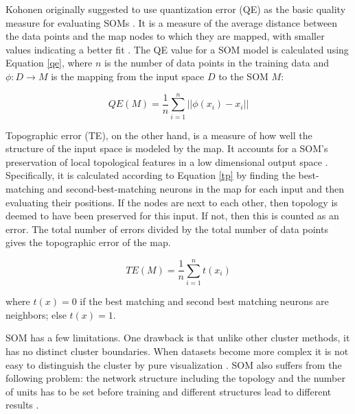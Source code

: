 Kohonen originally suggested to use quantization error (QE) as the basic quality measure for evaluating SOMs \cite{Kohonen2001}. It is a measure of the average distance between the data points and the map nodes to which they are mapped, with smaller values indicating a better fit \cite{SOM2017}. The QE value for a SOM model is calculated using Equation \ref{qe}, where $n$ is the number of data points in the training data and $\phi : D \rightarrow M$ is the mapping from the input
space $D$ to the SOM $M$:

\begin{equation}\label{qe}
QE(M) = \frac{1}{n} \sum_{i=1}^{n} || \phi (x_i) - x_i||
\end{equation}

Topographic error (TE), on the other hand, is a measure of how well the structure of the input space is modeled by the map. It accounts for a SOM's preservation of local topological features in a low dimensional output space \cite{SOM2017}. Specifically, it is calculated according to Equation \ref{tp} by finding the best-matching and second-best-matching neurons in the map for each input and then evaluating their positions. If the nodes are next to each other, then topology is deemed to have been preserved for this input. If not, then this is counted as an error. The total number of errors divided by the total number of data points gives the topographic error of the map.  

\begin{equation}\label{tp}
TE(M) = \frac{1}{n} \sum_{i=1}^{n} t(x_i)
\end{equation}

where $t(x) = 0$ if the best matching and second best matching neurons are neighbors; else $t(x) = 1$.



SOM has a few limitations. One drawback is that unlike other cluster methods, it has no distinct cluster boundaries. When datasets become more complex it is not easy to distinguish the cluster by pure visualization \cite{SOM2016casestudy}. SOM also suffers from the following problem: the network structure including the topology and the number of units has to be set before training and different structures lead to different results \cite{SOM2003}. 

